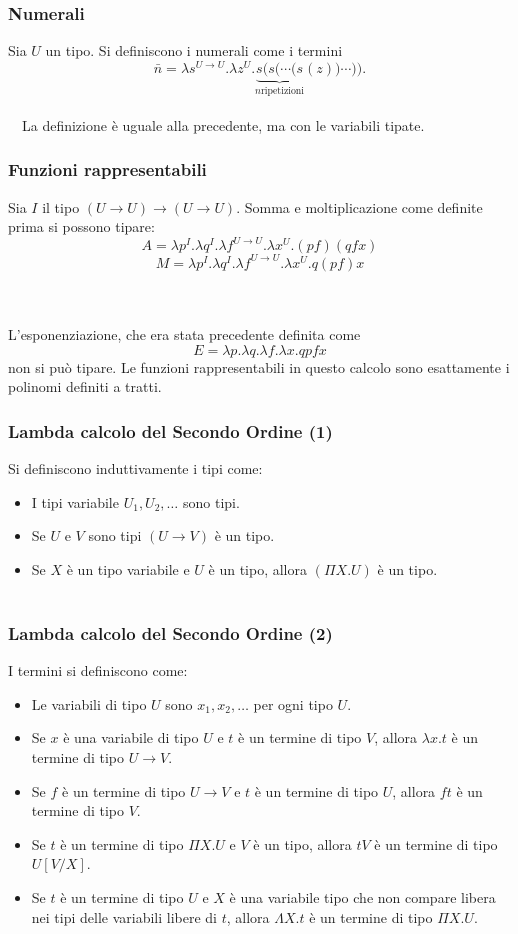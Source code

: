 \documentclass{beamer}
\renewcommand{\l}{\lambda}
\renewcommand{\L}{\Lambda}
\newcommand{\ar}{\rightarrow}
\begin{document}
\begin{frame}
    \frametitle{Numerali}
    Sia $U$ un tipo. Si definiscono i numerali come i termini
    \[
        \bar{n} = \l s^{U\ar U}. \l z^{U}. \underbrace{s ( s ( \cdots (s}_{n\text{
            ripetizioni}} (z))\cdots )).
    \]
    \\~\
    La definizione \`e uguale alla precedente, ma con le variabili tipate.
\end{frame}


\begin{frame}
    \frametitle{Funzioni rappresentabili}

    Sia $I$ il tipo $(U\ar U)\ar (U\ar U)$.
    Somma e moltiplicazione come definite prima si possono tipare:
    \[
        A = \l p^I. \l q^I. \l f^{U\ar U}. \l x^U. (pf)(qfx)
    \]
    \[
            M = \l p^I. \l q^I. \l f^{U\ar U}. \l x^U. q(pf)x
    \]
    \\~\
    
    L'esponenziazione, che era stata precedente definita come
    \[
        E = \l p. \l q. \l f. \l x. qpfx
    \]
    non si pu\`o tipare. Le funzioni rappresentabili in questo calcolo sono
    esattamente i polinomi definiti a tratti.
\end{frame}

\begin{frame} 
    \frametitle{Lambda calcolo del Secondo Ordine (1)}
    Si definiscono induttivamente i tipi come:
    \begin{itemize}
        \item I tipi variabile $U_1, U_2, \dots$ sono tipi.
        \item Se $U$ e $V$ sono tipi $(U\ar V)$ \`e un tipo.
        \item Se $X$ \`e un tipo variabile e $U$ \`e un tipo, allora $(\Pi X.U)$
            \`e un tipo.
    \\~\
    \end{itemize}
\end{frame} 

\begin{frame} 
    \frametitle{Lambda calcolo del Secondo Ordine (2)}
    I termini si definiscono come:
    \begin{itemize}
        \item Le variabili di tipo $U$ sono $x_1, x_2, \dots$ per ogni tipo $U$.
        \item Se $x$ \`e una variabile di tipo $U$ e $t$ \`e un termine di tipo
            $V$, allora $\l x. t$ \`e un termine di tipo $U\ar V$.
        \item Se $f$ \`e un termine di tipo $U\ar V$ e $t$ \`e un termine di
            tipo $U$, allora $ft$ \`e un termine di tipo $V$.
        \item Se $t$ \`e un termine di tipo $\Pi X. U$ e $V$ \`e un tipo, allora
            $tV$ \`e un termine di tipo $U[V/X]$.
        \item Se $t$ \`e un termine di tipo $U$ e $X$ \`e una variabile tipo che
            non compare libera nei tipi delle variabili libere di $t$, allora
            $\L X. t$ \`e un termine di tipo $\Pi X. U$.
    \end{itemize}
\end{frame} 
\end{document}
